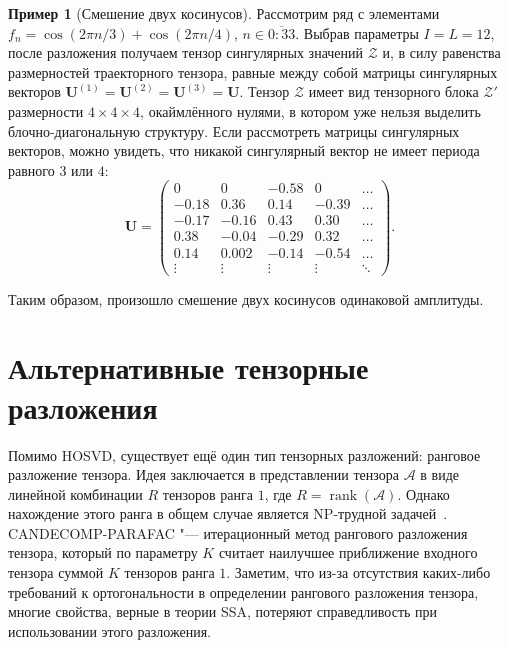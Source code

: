 \documentclass[specialist,
    substylefile = spbu_report.rtx,
    subf,href,colorlinks=true, 12pt]{disser}
\theoremstyle{plain}
\theoremstyle{definition}
\newtheorem{example}{Пример}[section]
\theoremstyle{remark}
\begin{document}
    \begin{example}[Смешение двух косинусов]
        Рассмотрим ряд с элементами $f_n=\cos(2\pi n/3) + \cos(2\pi n/4)$, $n\in\overline{0:33}$.
        Выбрав параметры $I=L=12$, после разложения получаем тензор сингулярных значений $\mathcal{Z}$ и, в силу равенства размерностей
        траекторного тензора, равные между собой матрицы сингулярных векторов $\mathbf{U}^{(1)}=\mathbf{U}^{(2)}=\mathbf{U}^{(3)}=\mathbf{U}$.
        Тензор $\mathcal{Z}$ имеет вид тензорного блока $\mathcal{Z}'$ размерности $4\times 4\times 4$, окаймлённого нулями, в
        котором уже нельзя выделить блочно-диагональную структуру.
        Если рассмотреть матрицы сингулярных векторов, можно увидеть, что никакой сингулярный вектор не имеет периода равного $3$ или $4$:
        \[
            \mathbf{U}=
            \begin{pmatrix}
                0      & 0      & -0.58  & 0      & \ldots \\
                -0.18  & 0.36   & 0.14   & -0.39  & \ldots \\
                -0.17  & -0.16  & 0.43   & 0.30   & \ldots \\
                0.38   & -0.04  & -0.29  & 0.32   & \ldots \\
                0.14   & 0.002  & -0.14  & -0.54  & \ldots \\
                \vdots & \vdots & \vdots & \vdots & \ddots
            \end{pmatrix}.
        \]

        Таким образом, произошло смешение двух косинусов одинаковой амплитуды.
    \end{example}


    \section{Альтернативные тензорные разложения}\label{sec:other-decomp}
    Помимо HOSVD, существует ещё один тип тензорных разложений: ранговое разложение тензора.
    Идея заключается в представлении тензора $\mathcal{A}$ в виде линейной комбинации $R$ тензоров ранга $1$, где $R=\operatorname{rank}(\mathcal{A})$.
    Однако нахождение этого ранга в общем случае является NP-трудной задачей~\cite{NP-hard}.
    CANDECOMP-PARAFAC "--- итерационный метод рангового разложения тензора, который по параметру $K$ считает наилучшее приближение
    входного тензора суммой $K$ тензоров ранга $1$.
    Заметим, что из-за отсутствия каких-либо требований к ортогональности в определении рангового разложения тензора,
    многие свойства, верные в теории SSA, потеряют справедливость при использовании этого разложения.
\end{document}
